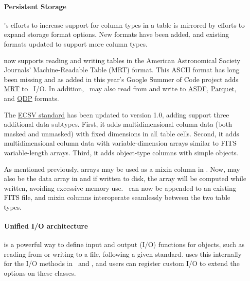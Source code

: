 \documentclass[modern]{aastex631}
\begin{document}
\paragraph{Persistent Storage}

\astropy's efforts to increase support for column types in a table is mirrored
by efforts to expand storage format options. New formats have been added, and
existing formats updated to support more column types.

\astropy now supports reading and writing tables in the American Astronomical
Society Journals' Machine-Readable Table (MRT) format. This ASCII format has
long been missing and as added in this year's Google Summer of Code project adds
\href{https://docs.astropy.org/en/stable/io/ascii/write.html#cds-mrt-format}{MRT}
to \astropyTable\ I/O. In addition, \astropyTable\ may also read from and write
to \href{https://asdf-standard.readthedocs.io/en/latest/}{ASDF},
\href{https://docs.astropy.org/en/stable/io/unified.html#table-io-parquet}{Parquet},
and \href{https://wwwastro.msfc.nasa.gov/qdp/}{QDP} formats.

The \href{https://github.com/astropy/astropy-APEs/blob/main/APE6.rst}{ECSV
standard} has been updated to version 1.0, adding support three additional data
subtypes. First, it adds multidimensional column data (both masked and unmasked)
with fixed dimensions in all table cells. Second, it adds multidimensional
column data with variable-dimension arrays similar to FITS variable-length
arrays. Third, it adds object-type columns with simple \python objects.

As mentioned previously,  arrays may be used as a mixin column in
\astropyTable. Now,  may also be the data array in
 and if written to disk, the array
will be computed while written, avoiding excessive memory use. \astropyTable\ can
now be appended to an existing FITS file, and  mixin columns
interoperate seamlessly between the two table types.

\paragraph{Unified I/O architecture}

 is a powerful way to define input and output (I/O)
functions for \astropypkg objects, such as reading from or writing to a file,
following a given standard. \astropy uses this internally for the I/O methods in
\astropyTable\ and \astropyCosmology, and users can register custom I/O to
extend the options on these classes.
\end{document}
